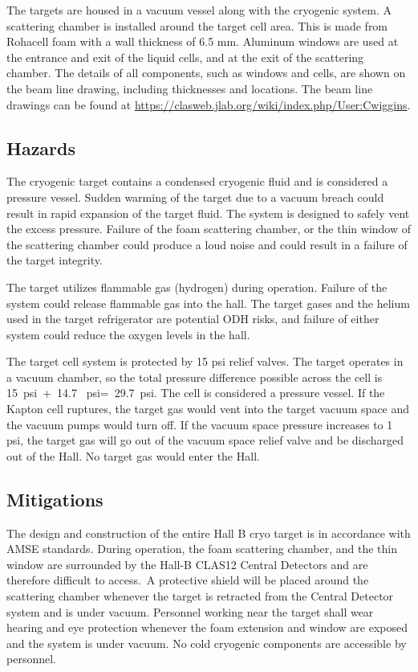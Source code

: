 The targets are housed in a vacuum vessel along with the cryogenic system. A scattering chamber is installed around the target cell area. This is made from Rohacell foam with a wall thickness of 6.5 mm. Aluminum windows are used at the entrance and exit of the liquid cells, and at the exit of the scattering chamber. The details of all components, such as windows and cells, are shown on the beam line drawing, including thicknesses and locations. The beam line drawings can be found at \href{https://clasweb.jlab.org/wiki/index.php/User:Cwiggins}{https://clasweb.jlab.org/wiki/index.php/User:Cwiggins}.

\subsection{Hazards} 

The cryogenic target contains a condensed cryogenic fluid and is considered a pressure vessel. Sudden warming of the target due to a vacuum breach could result in rapid expansion of the target fluid. The system is designed to safely vent the excess pressure. Failure of the foam scattering chamber, or the thin window of the scattering chamber could produce a loud noise and could result in a failure of the target integrity.

The target utilizes flammable gas (hydrogen) during operation. Failure of the system could release flammable gas into the hall. The target gases and the helium used in the target refrigerator are potential ODH risks, and failure of either system could reduce the oxygen levels in the hall.

The target cell system is protected by 15 psi relief valves.  The target operates in a vacuum chamber, so the total pressure difference possible across the cell is 15~psi~+~14.7 ~psi=~29.7~psi. The cell is considered a pressure vessel. If the Kapton cell ruptures, the target gas would vent into the target vacuum space and the vacuum pumps would turn off. If the vacuum space pressure increases to 1 psi, the target gas will go out of the vacuum space relief valve and be discharged out of the Hall. No target gas would enter the Hall.

\subsection{Mitigations}

The design and construction of the entire Hall B cryo target is in accordance with AMSE standards. During operation, the foam scattering chamber, and the thin window are surrounded by the Hall-B CLAS12 Central Detectors and are therefore difficult to access.~A protective shield will be placed around the scattering chamber whenever the target is retracted from the Central Detector system and is under vacuum.  Personnel working near the target shall wear hearing and eye protection whenever the foam extension and window are exposed and the system is under vacuum. No cold cryogenic components are accessible by personnel.

